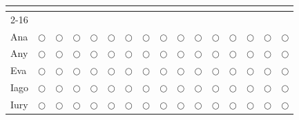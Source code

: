 \documentclass[12pt]{article}
\begin{document}
\begin{center}
\begin{longtable}{ |p{6cm}|c|c|c|c|c|c|c|c|c|c|c|c|c|c|c|}
\hline
\hline

\multicolumn{16}{c}{\vspace*{0.5cm}\LARGE{\textbf{}}}\\
\cline{2-16}
\multicolumn{1}{c|}{}  &
&&&&&&&&&&&&&&\\ [6ex]
\hline
Ana 
&$\bigcirc$
&$\bigcirc$&$\bigcirc$&$\bigcirc$&$\bigcirc$&$\bigcirc$&$\bigcirc$&$\bigcirc$&$\bigcirc$&$\bigcirc$&$\bigcirc$&$\bigcirc$&$\bigcirc$&$\bigcirc$&$\bigcirc$\\
\hline
Any 
&$\bigcirc$
&$\bigcirc$&$\bigcirc$&$\bigcirc$&$\bigcirc$&$\bigcirc$&$\bigcirc$&$\bigcirc$&$\bigcirc$&$\bigcirc$&$\bigcirc$&$\bigcirc$&$\bigcirc$&$\bigcirc$&$\bigcirc$\\
\hline
Eva  
&$\bigcirc$&$\bigcirc$
&$\bigcirc$&$\bigcirc$&$\bigcirc$&$\bigcirc$&$\bigcirc$&$\bigcirc$&$\bigcirc$&$\bigcirc$&$\bigcirc$&$\bigcirc$&$\bigcirc$&$\bigcirc$&$\bigcirc$\\
\hline
 Iago 
&$\bigcirc$
&$\bigcirc$&$\bigcirc$&$\bigcirc$&$\bigcirc$&$\bigcirc$&$\bigcirc$&$\bigcirc$&$\bigcirc$&$\bigcirc$&$\bigcirc$&$\bigcirc$&$\bigcirc$&$\bigcirc$&$\bigcirc$\\
\hline
Iury 
&$\bigcirc$&$\bigcirc$
&$\bigcirc$&$\bigcirc$&$\bigcirc$&$\bigcirc$&$\bigcirc$&$\bigcirc$&$\bigcirc$&$\bigcirc$&$\bigcirc$&$\bigcirc$&$\bigcirc$&$\bigcirc$&$\bigcirc$\\

\end{longtable}
\end{center}
\end{document}
